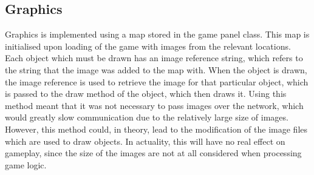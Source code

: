 \subsection{Graphics}
Graphics is implemented using a map stored in the game panel class. This map is initialised upon loading of the game with images from the relevant locations. Each object which must be drawn has an image reference string, which refers to the string that the image was added to the map with. When the object is drawn, the image reference is used to retrieve the image for that particular object, which is passed to the draw method of the object, which then draws it. Using this method meant that it was not necessary to pass images over the network, which would greatly slow communication due to the relatively large size of images. However, this method could, in theory, lead to the modification of the image files which are used to draw objects. In actuality, this will have no real effect on gameplay, since the size of the images are not at all considered when processing game logic.
